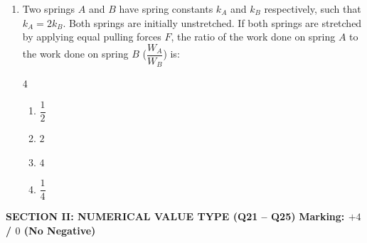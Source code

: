 \documentclass[11pt,a4paper]{article}
\begin{document}
\begin{enumerate}[label=\textbf{\arabic*.},leftmargin=18pt,itemsep=12pt]
  \item Two springs $A$ and $B$ have spring constants $k_A$ and $k_B$ respectively, such that $k_A = 2 k_B$. Both springs are initially unstretched. If both springs are stretched by applying equal pulling forces $F$, the ratio of the work done on spring $A$ to the work done on spring $B$ ($\dfrac{W_A}{W_B}$) is:
  \begin{multicols}{4}
    \begin{enumerate}[label=(\Alph*)]
      \item $\dfrac{1}{2}$
      \item $2$
      \item $4$
      \item $\dfrac{1}{4}$
    \end{enumerate}
  \end{multicols}

\end{enumerate}

\vspace{10pt}

\begin{tcolorbox}[sectionbanner]
  {\large \textbf{\textsf{SECTION II: NUMERICAL VALUE TYPE (Q21 -- Q25)}}} \hfill {\small \textbf{Marking: $+4$ / $0$ (No Negative)}}
\end{tcolorbox}
\vspace{4pt}
\end{document}
